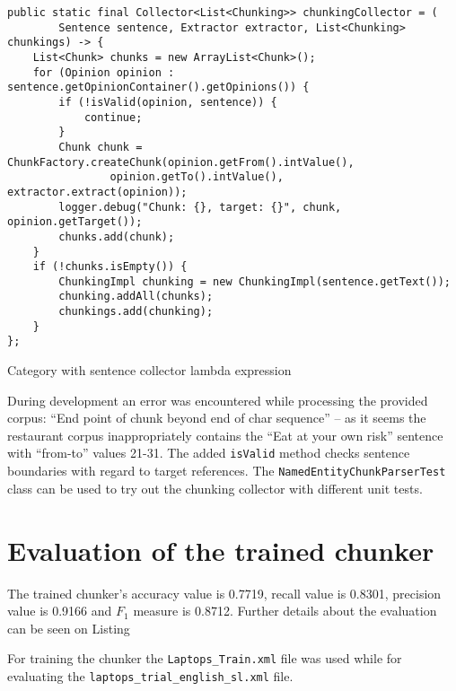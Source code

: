 \begin{listing}
\begin{verbatim}
public static final Collector<List<Chunking>> chunkingCollector = (
        Sentence sentence, Extractor extractor, List<Chunking> chunkings) -> {
    List<Chunk> chunks = new ArrayList<Chunk>();
    for (Opinion opinion : sentence.getOpinionContainer().getOpinions()) {
        if (!isValid(opinion, sentence)) {
            continue;
        }
        Chunk chunk = ChunkFactory.createChunk(opinion.getFrom().intValue(),
                opinion.getTo().intValue(), extractor.extract(opinion));
        logger.debug("Chunk: {}, target: {}", chunk, opinion.getTarget());
        chunks.add(chunk);
    }
    if (!chunks.isEmpty()) {
        ChunkingImpl chunking = new ChunkingImpl(sentence.getText());
        chunking.addAll(chunks);
        chunkings.add(chunking);
    }
};
\end{verbatim}
\caption{Category with sentence collector lambda expression}
\label{listing:chunkingCollector}
\end{listing}

During development an error was encountered while processing the provided
corpus: ``End point of chunk beyond end of char sequence'' -- as it seems the
restaurant corpus inappropriately contains the ``Eat at your own risk'' sentence
with ``from-to'' values 21-31. The added \verb|isValid| method checks sentence
boundaries with regard to target references. The
\verb|NamedEntityChunkParserTest| class can be used to try out the chunking
collector with different unit tests.

\section*{Evaluation of the trained chunker}
The trained chunker's accuracy value is 0.7719, recall value is 0.8301,
precision value is 0.9166 and $F_1$ measure is 0.8712. Further details about the
evaluation can be seen on Listing 

For training the chunker the \texttt{Laptops\_Train.xml} file was used while for
evaluating the \texttt{laptops\_trial\_english\_sl.xml} file.

